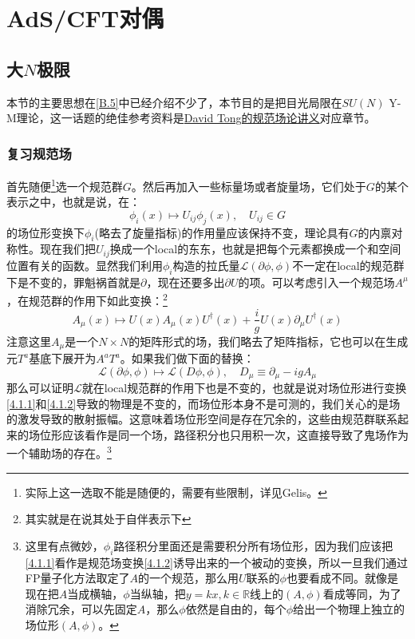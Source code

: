 \chapter{AdS/CFT对偶}
\section{大$N$极限}
本节的主要思想在\ref{B.5}中已经介绍不少了，本节目的是把目光局限在$SU(N)$ Y-M理论，这一话题的绝佳参考资料是\href{https://www.damtp.cam.ac.uk/user/tong/gaugetheory.html}{David Tong的规范场论讲义}对应章节。
\subsection{复习规范场}
首先随便\footnote{实际上这一选取不能是随便的，需要有些限制，详见Gelis\cite{Gelis:2019yfm}。}选一个规范群$G$。然后再加入一些标量场或者旋量场，它们处于$G$的某个表示之中，也就是说，在：
\begin{equation}\label{4.1.1}
	\phi_i(x)\mapsto U_{ij}\phi_j(x),\quad U_{ij}\in G
\end{equation}
的场位形变换下$\phi_i$(略去了旋量指标)的作用量应该保持不变，理论具有$G$的内禀对称性。现在我们把$U_{ij}$换成一个local的东东，也就是把每个元素都换成一个和空间位置有关的函数。显然我们利用$\phi_i$构造的拉氏量$\mathcal{L}(\partial\phi,\phi)$不一定在local的规范群下是不变的，罪魁祸首就是$\partial$，现在还要多出$\partial U$的项。可以考虑引入一个规范场$A^\mu$，在规范群的作用下如此变换：\footnote{其实就是在说其处于自伴表示下}
\begin{equation}\label{4.1.2}
	A_\mu(x)\mapsto U(x)A_\mu (x)U^\dagger (x)+\frac i g U(x)\partial_\mu U^\dagger(x)
\end{equation}
注意这里$A_\mu$是一个$N\times N$的矩阵形式的场，我们略去了矩阵指标，它也可以在生成元$T^a$基底下展开为$A^a T^a$。如果我们做下面的替换：
\begin{equation}
	\mathcal{L}(\partial\phi,\phi)\mapsto\mathcal{L}(D\phi,\phi),\quad D_\mu\equiv \partial_\mu -igA_\mu
\end{equation}
那么可以证明$\mathcal{L}$就在local规范群的作用下也是不变的，也就是说对场位形进行变换\ref{4.1.1}和\ref{4.1.2}导致的物理是不变的，而场位形本身不是可测的，我们关心的是场的激发导致的散射振幅。这意味着场位形空间是存在冗余的，这些由规范群联系起来的场位形应该看作是同一个场，路径积分也只用积一次，这直接导致了鬼场作为一个辅助场的存在。\footnote{这里有点微妙，$\phi_i$路径积分里面还是需要积分所有场位形，因为我们应该把\ref{4.1.1}看作是规范场变换\ref{4.1.2}诱导出来的一个被动的变换，所以一旦我们通过FP量子化方法取定了$A$的一个规范，那么用$U$联系的$\phi$也要看成不同。就像是现在把$A$当成横轴，$\phi$当纵轴，把$y=kx,k\in\mathbb{R}$线上的$(A,\phi)$看成等同，为了消除冗余，可以先固定$A$，那么$\phi$依然是自由的，每个$\phi$给出一个物理上独立的场位形$(A,\phi)$。}
